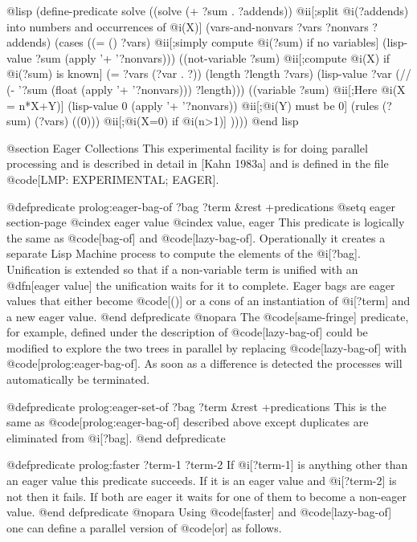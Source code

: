 {@lisp
(define-predicate solve
  ((solve (+ ?sum . ?addends))
   @ii[;split @i(?addends) into numbers and occurrences of @i(X)]
   (vars-and-nonvars ?vars ?nonvars ?addends) 
   (cases ((= () ?vars) @ii[;simply compute @i(?sum) if no variables]
           (lisp-value ?sum (apply '+ '?nonvars)))
          ((not-variable ?sum) @ii[;compute @i(X) if @i(?sum) is known]
           (= ?vars (?var . ?)) 
           (length ?length ?vars)
           (lisp-value ?var
                       (// (- '?sum (float (apply '+ '?nonvars)))
		           ?length)))
          ((variable ?sum) @ii[;Here  @i(X = n*X+Y)]
           (lisp-value 0 (apply '+ '?nonvars)) @ii[;@i(Y) must be 0]
           (rules (?sum)
                  (?vars)
                  ((0))) @ii[;@i(X=0) if @i(n>1)]
           ))))
@end lisp

@section Eager Collections
This experimental facility is for doing parallel processing and
is described in detail in [Kahn 1983a] and is defined in the file
@code[LMP: EXPERIMENTAL; EAGER].

@defpredicate prolog:eager-bag-of ?bag ?term &rest +predications
@setq eager section-page
@cindex eager value
@cindex value, eager
This predicate is logically the same as @code[bag-of] and @code[lazy-bag-of].
Operationally it creates a separate Lisp Machine process to compute the
elements of the @i[?bag].
Unification is extended so that if a non-variable term is unified with
an @dfn[eager value] the unification waits for it to complete.
Eager bags are eager values that either become @code[()] or a cons of an
instantiation of @i[?term] and a new eager value.
@end defpredicate
@nopara
The @code[same-fringe] predicate, for example, defined under the
description of @code[lazy-bag-of] could be modified to explore the two
trees in parallel by replacing @code[lazy-bag-of] with @code[prolog:eager-bag-of].
As soon as a difference is detected the processes will automatically
be terminated.

@defpredicate prolog:eager-set-of ?bag ?term &rest +predications
This is the same as @code[prolog:eager-bag-of] described above except 
duplicates are eliminated from @i[?bag].
@end defpredicate

@defpredicate prolog:faster ?term-1 ?term-2
If @i[?term-1] is anything other than an eager value this predicate
succeeds.
If it is an eager value and @i[?term-2] is not then it fails.
If both are eager it waits for one of them to become a non-eager value.
@end defpredicate
@nopara
Using @code[faster] and @code[lazy-bag-of] one can define a parallel version of
@code[or] as follows.

}
